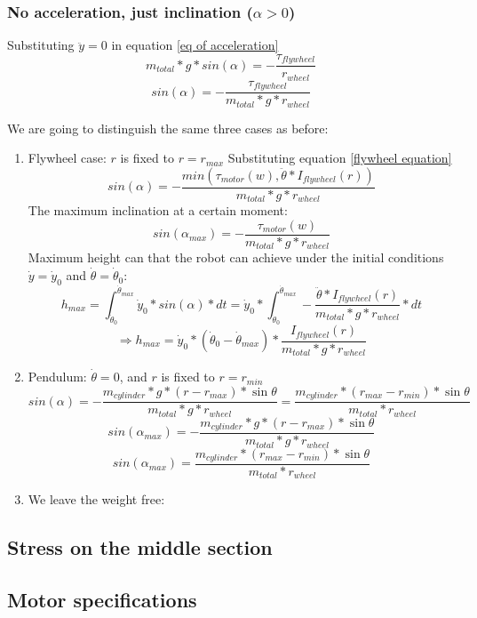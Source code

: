 \subsubsection{No acceleration, just inclination ($\alpha > 0$)}
Substituting $\ddot{y}=0$ in equation \ref{eq of acceleration}
\[m_{total} * g * sin(\alpha) = - \frac{\tau_{flywheel}}{r_{wheel}} \]
\[sin(\alpha) = - \frac{\tau_{flywheel}}{m_{total} * g * r_{wheel}} \]

We are going to distinguish the same three cases as before:
\begin{enumerate}
    \item Flywheel case: $r$ is fixed to $r = r_{max}$
    Substituting equation \ref{flywheel equation}
    \[sin(\alpha) = - \frac{min(\tau_{motor} (w), \ddot{\theta}*I_{flywheel}(r))}{m_{total} * g * r_{wheel}} \]
    The maximum inclination at a certain moment:
    \[sin(\alpha_{max}) = - \frac{\tau_{motor} (w)}{m_{total} * g * r_{wheel}} \]
    Maximum height can that the robot can achieve under the initial conditions $\dot{y}=\dot{y}_0$ and $\dot{\theta}=\dot{\theta}_0$:
    \[h_{max}=\int_{\dot{\theta}_0}^{\dot{\theta}_{max}} \dot{y}_0*sin(\alpha) * dt  = \dot{y}_0* \int_{\dot{\theta}_0}^{\dot{\theta}_{max}} - \frac{\ddot{\theta}*I_{flywheel}(r)}{m_{total} * g * r_{wheel}} * dt\]
    \[\boxed{\Rightarrow h_{max}= \dot{y}_0* (\dot{\theta}_0-\dot{\theta}_{max}) * \frac{I_{flywheel}(r)}{m_{total} * g * r_{wheel}}}\]

    \item Pendulum: $\dot{\theta} = 0$, and $r$ is fixed to $r = r_{min}$
    \[sin(\alpha) = - \frac{m_{cylinder} * g * (r - r_{max}) * \sin{\theta}}{m_{total} * g * r_{wheel}} = \frac{m_{cylinder} * (r_{max}- r_{min}) * \sin{\theta}}{m_{total} * r_{wheel}} \]
    \[sin(\alpha_{max}) = - \frac{m_{cylinder} * g * (r - r_{max}) * \sin{\theta}}{m_{total} * g * r_{wheel}}\]
    \[\boxed{sin(\alpha_{max}) = \frac{m_{cylinder} * (r_{max}- r_{min}) * \sin{\theta}}{m_{total} * r_{wheel}}} \]
    
    \item We leave the weight free:

\end{enumerate}
\subsection{Stress on the middle section}


\subsection{Motor specifications}

